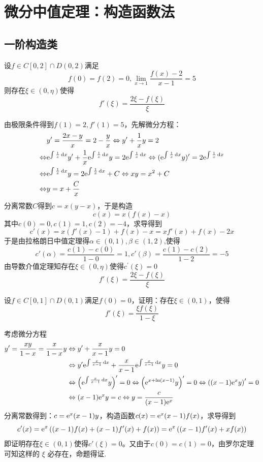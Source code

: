 \chapter{微分中值定理：构造函数法}
\section{一阶构造类}
\begin{example}[$f'(\xi)=\frac{2\xi-f(\xi)}{\xi}$]
设$f\in C[0,2]\cap D(0,2)$满足\[f(0)=f(2)=0,\lim_{x\to 1}\dfrac{f(x)-2}{x-1}=5\]则存在$\xi\in(0,\eta)$使得\[f'(\xi)=\frac{2\xi-f(\xi)}{\xi}\]
\end{example}
\begin{solution}
由极限条件得到$f(1)=2,f'(1)=5$，先解微分方程：
\begin{align*}
&y'=\frac{2x-y}{x}=2-\frac{y}{x}\Leftrightarrow y'+\frac{1}{x}y=2\\
\Leftrightarrow& \mathrm{e}^{\int\frac{1}{x}\mathop{}\!\mathrm{d} x}y'+\frac{1}{x}\mathrm{e}^{\int\frac{1}{x}\mathop{}\!\mathrm{d} x}y=2\mathrm{e}^{\int\frac{1}{x}\mathop{}\!\mathrm{d} x}\Leftrightarrow(\mathrm{e}^{\int\frac{1}{x}\mathop{}\!\mathrm{d} x}y)'=2\mathrm{e}^{\int\frac{1}{x}\mathop{}\!\mathrm{d} x}\\
\Leftrightarrow& \mathrm{e}^{\int\frac{1}{x}\mathop{}\!\mathrm{d} x}y=2\mathrm{e}^{\int\frac{1}{x}\mathop{}\!\mathrm{d} x}+C\Leftrightarrow xy=x^2+C\\
\Leftrightarrow& y=x+\frac{C}{x}
\end{align*}
分离常数$C$得到$c=x(y-x)$，于是构造\[c(x)=x(f(x)-x)\]
其中$c(0)=0,c(1)=1,c(2)=-4$，求导得到\[c'(x)=x(f'(x)-1)+f(x)-x=xf'(x)+f(x)-2x\]
于是由拉格朗日中值定理得$\alpha\in\left(0,1\right),\beta\in\left(1,2\right)$,使得
\[c'\left(\alpha\right)=\frac{c\left(1\right)-c\left(0\right)}{1-0}=1,c'\left(\beta\right)=\frac{c\left(1\right)-c\left(2\right)}{1-2}=-5\]
由导数介值定理知存在$\xi\in\left(0,\eta\right)$使得$c^{\prime}\left(\xi\right)=0$
\[f'\left(\xi\right)=\frac{2\xi-f\left(\xi\right)}{\xi}\]
\end{solution}
\newpage
\begin{example}[$f'(\xi)=\frac{\xi f(\xi)}{1-\xi}$]
设$f\in C[0,1]\cap D(0,1)$满足$f(0)=0$，证明：存在$\xi\in(0,1)$，使得\[f'(\xi)=\frac{\xi f(\xi)}{1-\xi}\]
\end{example}
\begin{solution}
    考虑微分方程
    \begin{align*}
        y'=\frac{xy}{1-x}=\frac{x}{1-x}y&\Leftrightarrow y'+\frac{x}{x-1}y=0\\
        &\Leftrightarrow y'\mathrm{e}^{\int\frac{x}{x-1}\mathop{}\!\mathrm{d} x}+\frac{x}{x-1}\mathrm{e}^{\int\frac{x}{x-1}\mathop{}\!\mathrm{d} x}y=0\\
        &\Leftrightarrow\left(\mathrm{e}^{\int\frac{x}{x-1}\mathop{}\!\mathrm{d} x}y\right)'=0\Leftrightarrow\left(\mathrm{e}^{x+\ln(x-1)}y\right)'=0\Leftrightarrow\left((x-1)\mathrm{e}^xy\right)'=0\\
        &\Leftrightarrow (x-1)\mathrm{e}^xy=c\Leftrightarrow y=\frac{c}{(x-1)\mathrm{e}^x}
    \end{align*}
    分离常数得到：$c=\mathrm{e}^x(x-1)y$，构造函数$c(x)=\mathrm{e}^x(x-1)f(x)$，求导得到\[c'(x)=\mathrm{e}^x\left((x-1)f(x)+(x-1)f'(x)+f(x)\right)=\mathrm{e}^x\left((x-1)f'(x)+xf(x)\right)\]
    即证明存在$\xi\in(0,1)$使得$c'(\xi)=0$。又由于$c(0)=c(1)=0$，由罗尔定理可知这样的 $\xi$ 必存在，命题得证.
\end{solution}
